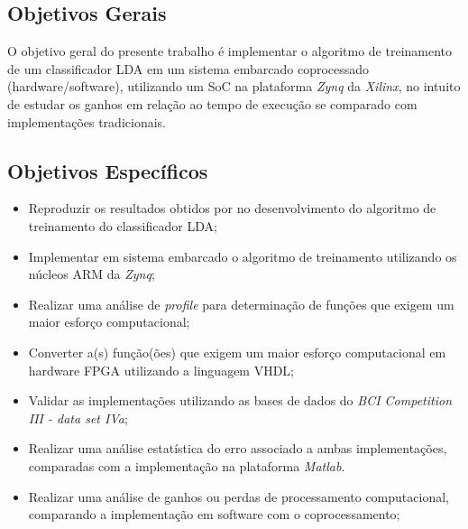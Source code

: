 \subsection{Objetivos Gerais}

	O objetivo geral do presente trabalho é implementar o algoritmo de treinamento de um classificador LDA em um sistema embarcado coprocessado (hardware/software), utilizando um SoC na plataforma \textit{Zynq} da \textit{Xilinx}, no intuito de estudar os ganhos em relação ao tempo de execução se comparado com implementações tradicionais.

\subsection{Objetivos Específicos}

\begin{itemize}
	\item Reproduzir os resultados obtidos por \cite{F.Lotte} no desenvolvimento do algoritmo de treinamento do classificador LDA;

	\item Implementar em sistema embarcado o algoritmo de treinamento utilizando os núcleos ARM da \textit{Zynq};
	
	\item Realizar uma análise de \textit{profile} para determinação de funções que exigem um maior esforço computacional;
	
	\item Converter a(s) função(ões) que exigem um maior esforço computacional em hardware FPGA utilizando a linguagem VHDL;
	

	\item Validar as implementações utilizando as bases de dados do \textit{BCI Competition III - data set IVa};
	
	\item Realizar uma análise estatística do erro associado a ambas implementações, comparadas com a implementação na plataforma \textit{Matlab}.
	
	\item Realizar uma análise de ganhos ou perdas de processamento computacional, comparando a implementação em software com o coprocessamento;
\end{itemize}
